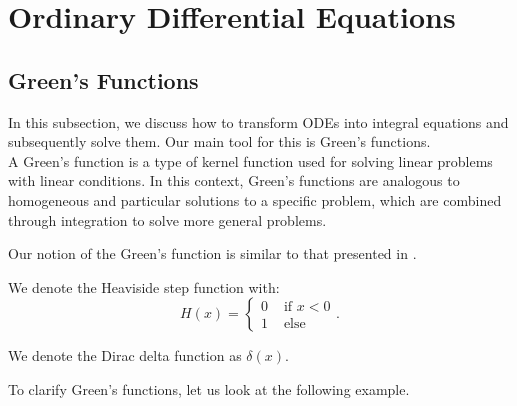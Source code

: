 \documentclass[a4paper,12pt]{article}
\begin{document}
\section{Ordinary Differential Equations}

\subsection{Green's Functions}
\label{sec:greens functions}

In this subsection, we discuss how to transform ODEs into integral equations and
subsequently solve them. Our main tool for this is Green's functions. \\

A Green's function is a type of kernel function used
for solving linear problems with linear conditions. In this context,
Green's functions are analogous to homogeneous and particular solutions
to a specific problem, which are combined through integration to solve
more general problems.

\begin{related}
  Our notion of the Green's function is similar to that presented
  in \cite{hwang_simulationtabulation_2001}.
\end{related}


\begin{notation}[$H$]
  We denote the Heaviside step function with:
  \begin{equation}
    H(x) = \begin{cases}
      0 & \text{ if } x<0 \\
      1 & \text{ else }
    \end{cases}.
  \end{equation}
\end{notation}

\begin{notation}[$\delta$]
  We denote the Dirac delta function as $\delta(x)$.
\end{notation}


To clarify Green's functions, let us look at the following example.
\end{document}

